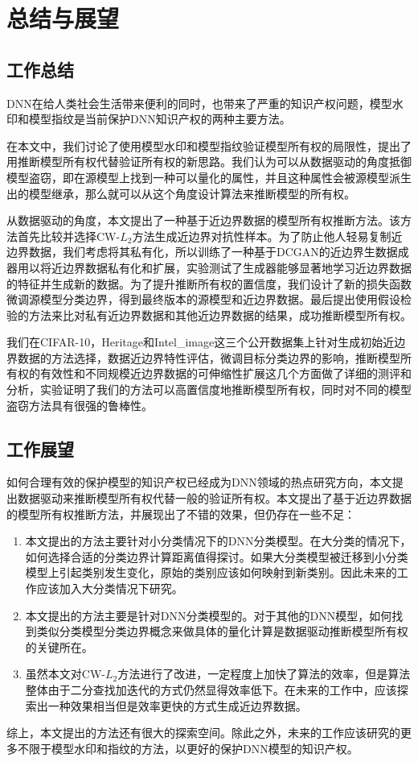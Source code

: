 \chapter{总结与展望}\label{6}


\section{工作总结}

DNN在给人类社会生活带来便利的同时，也带来了严重的知识产权问题，模型水印和模型指纹是当前保护DNN知识产权的两种主要方法。

在本文中，我们讨论了使用模型水印和模型指纹验证模型所有权的局限性，提出了用推断模型所有权代替验证所有权的新思路。我们认为可以从数据驱动的角度抵御模型盗窃，即在源模型上找到一种可以量化的属性，并且这种属性会被源模型派生出的模型继承，那么就可以从这个角度设计算法来推断模型的所有权。

从数据驱动的角度，本文提出了一种基于近边界数据的模型所有权推断方法。该方法首先比较并选择CW-$L_2$方法生成近边界对抗性样本。为了防止他人轻易复制近边界数据，我们考虑将其私有化，所以训练了一种基于DCGAN的近边界生数据成器用以将近边界数据私有化和扩展，实验测试了生成器能够显著地学习近边界数据的特征并生成新的数据。为了提升推断所有权的置信度，我们设计了新的损失函数微调源模型分类边界，得到最终版本的源模型和近边界数据。最后提出使用假设检验的方法来比对私有近边界数据和其他近边界数据的结果，成功推断模型所有权。

我们在CIFAR-10，Heritage和Intel\_image这三个公开数据集上针对生成初始近边界数据的方法选择，数据近边界特性评估，微调目标分类边界的影响，推断模型所有权的有效性和不同规模近边界数据的可伸缩性扩展这几个方面做了详细的测评和分析，实验证明了我们的方法可以高置信度地推断模型所有权，同时对不同的模型盗窃方法具有很强的鲁棒性。



\section{工作展望}

如何合理有效的保护模型的知识产权已经成为DNN领域的热点研究方向，本文提出数据驱动来推断模型所有权代替一般的验证所有权。本文提出了基于近边界数据的模型所有权推断方法，并展现出了不错的效果，但仍存在一些不足：

\begin{enumerate}
	\renewcommand{\labelenumi}{\theenumi)}
	\item 本文提出的方法主要针对小分类情况下的DNN分类模型。在大分类的情况下，如何选择合适的分类边界计算距离值得探讨。如果大分类模型被迁移到小分类模型上引起类别发生变化，原始的类别应该如何映射到新类别。因此未来的工作应该加入大分类情况下研究。
	\item 本文提出的方法主要是针对DNN分类模型的。对于其他的DNN模型，如何找到类似分类模型分类边界概念来做具体的量化计算是数据驱动推断模型所有权的关键所在。
	\item 虽然本文对CW-$L_2$方法进行了改进，一定程度上加快了算法的效率，但是算法整体由于二分查找加迭代的方式仍然显得效率低下。在未来的工作中，应该探索出一种效果相当但是效率更快的方式生成近边界数据。
\end{enumerate}

综上，本文提出的方法还有很大的探索空间。除此之外，未来的工作应该研究的更多不限于模型水印和指纹的方法，以更好的保护DNN模型的知识产权。





